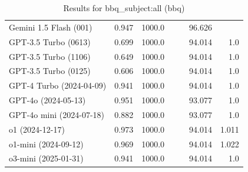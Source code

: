\begin{table}[htp]
{\begin{tabular}{lrrrrrr}
Gemini 1.5 Flash (001) & 0.947 & 1000.0 &  &  & 96.626 &  \\
GPT-3.5 Turbo (0613) & 0.699 & 1000.0 &  &  & 94.014 & 1.0 \\
GPT-3.5 Turbo (1106) & 0.649 & 1000.0 &  &  & 94.014 & 1.0 \\
GPT-3.5 Turbo (0125) & 0.606 & 1000.0 &  &  & 94.014 & 1.0 \\
GPT-4 Turbo (2024-04-09) & 0.941 & 1000.0 &  &  & 94.014 & 1.0 \\
GPT-4o (2024-05-13) & 0.951 & 1000.0 &  &  & 93.077 & 1.0 \\
GPT-4o mini (2024-07-18) & 0.882 & 1000.0 &  &  & 93.077 & 1.0 \\
o1 (2024-12-17) & 0.973 & 1000.0 &  &  & 94.014 & 1.011 \\
o1-mini (2024-09-12) & 0.969 & 1000.0 &  &  & 94.014 & 1.022 \\
o3-mini (2025-01-31) & 0.941 & 1000.0 &  &  & 94.014 & 1.0 \\
\bottomrule
\end{tabular}}
\caption{Results for bbq_subject:all (bbq)}
\label{fig:bbq_subject:all (bbq)}
\end{table}